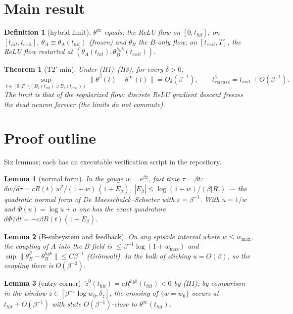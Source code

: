 \documentclass[11pt]{article}
\newtheorem{theorem}{Theorem}
\newtheorem{lemma}{Lemma}
\newtheorem{definition}{Definition}
\begin{document}
\section{Main result}
\begin{definition}[hybrid limit]\label{def:hybrid}
$\theta^\infty$ equals: the ReLU flow on $[0,t_{hit}]$; on $[t_{hit},t_{exit}]$,
$\theta_A\equiv\theta_A(t_{hit})$ (frozen) and $\theta_B$ the $B$-only flow; on
$[t_{exit},T]$, the ReLU flow restarted at
$(\theta_A(t_{hit}),\theta_B^{hyb}(t_{exit}))$.
\end{definition}

\begin{theorem}[T2$'$-min]\label{thm:main}
Under (H1)--(H3), for every $\delta>0$,
\[
\sup_{t\in[0,T]\setminus(B_\delta(t_{hit})\cup B_\delta(t_{exit}))}
\|\theta^\beta(t)-\theta^\infty(t)\| = O_\delta(\beta^{-1}),
\qquad
t^\beta_{release}=t_{exit}+O(\beta^{-1}).
\]
The limit is that of the regularized flow: discrete ReLU gradient descent
freezes the dead neuron forever (the limits do not commute).
\end{theorem}

\section{Proof outline}\label{sec:proof}
Six lemmas; each has an executable verification script in the repository.

\begin{lemma}[normal form]\label{lem:gauge}
In the gauge $w=e^{\beta z}$, fast time $\tau=\beta t$:
$dw/d\tau=cR(t)\,w^2/(1+w)\,(1+E_\beta)$, $|E_\beta|\le\log(1+w)/(\beta|R|)$
--- the quadratic normal form of De Maesschalck--Schecter with
$\varepsilon=\beta^{-1}$. With $u=1/w$ and $\Phi(u)=\log u+u$ one has the exact
quadrature $d\Phi/dt=-c\beta R(t)(1+E_\beta)$.
\end{lemma}

\begin{lemma}[B-subsystem and feedback]\label{lem:gronwall}
On any episode interval where $w\le w_{\max}$, the coupling of $A$ into the
$B$-field is $\le\beta^{-1}\log(1+w_{\max})$ and
$\sup\|\theta_B^\beta-\theta_B^{hyb}\|\le C\beta^{-1}$ (Gr\"onwall). In the bulk
of sticking $u=O(\beta)$, so the coupling there is $O(\beta^{-2})$.
\end{lemma}

\begin{lemma}[entry corner]\label{lem:corner-in}
$\dot z^0(t_{hit}^-)=cR^{hyb}(t_{hit})<0$ by (H1); by comparison in the window
$z\in[\beta^{-1}\log w_0,\delta_z]$, the crossing of $\{w=w_0\}$ occurs at
$t_{hit}+O(\beta^{-1})$ with state $O(\beta^{-1})$-close to
$\theta^\infty(t_{hit})$.
\end{lemma}
\end{document}
